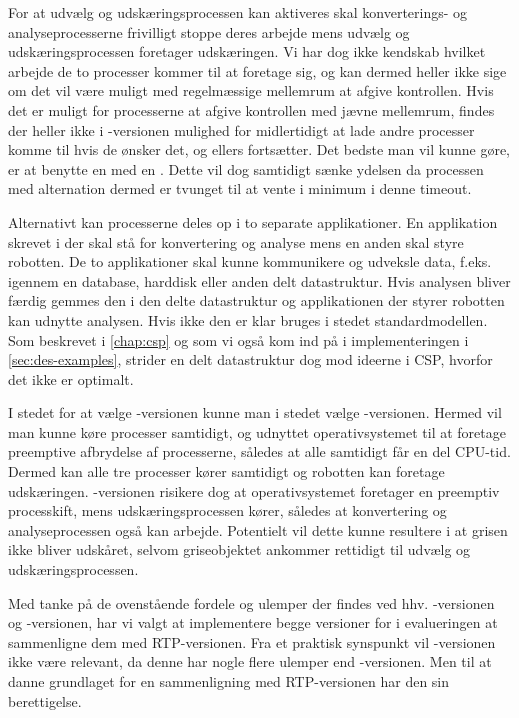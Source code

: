 For at  udvælg og udskæringsprocessen kan aktiveres skal konverterings- og analyseprocesserne frivilligt stoppe deres arbejde mens  udvælg og udskæringsprocessen foretager udskæringen.  Vi har dog ikke kendskab hvilket arbejde de to processer kommer til at foretage sig, og kan dermed heller ikke sige om det vil være muligt med regelmæssige mellemrum at afgive kontrollen. Hvis det er muligt for processerne at afgive kontrollen med jævne mellemrum, findes der heller ikke i -versionen mulighed for midlertidigt at lade andre processer  komme til hvis de ønsker det, og ellers fortsætter. Det bedste man vil kunne gøre, er at benytte en   med en . Dette vil dog samtidigt sænke ydelsen da  processen med alternation dermed er tvunget til at vente i minimum i denne timeout. 

Alternativt kan processerne deles op i to separate applikationer. En applikation skrevet i \pycsp der skal stå for konvertering og analyse mens en anden skal styre robotten. De to applikationer skal kunne kommunikere og  udveksle data, f.eks. igennem en database, harddisk eller anden delt datastruktur. Hvis analysen bliver færdig gemmes den i den delte datastruktur og applikationen der styrer robotten kan udnytte analysen. Hvis ikke den er klar bruges i stedet standardmodellen. Som beskrevet i \autoref{chap:csp} og som vi også kom ind på i implementeringen i \autoref{sec:des-examples}, strider en delt datastruktur dog mod ideerne i CSP, hvorfor det ikke er optimalt.

I stedet for at vælge -versionen kunne man i stedet vælge -versionen. Hermed vil man kunne køre processer samtidigt, og udnyttet operativsystemet til at foretage preemptive afbrydelse af  processerne, således at alle samtidigt får en del CPU-tid. Dermed kan alle tre processer kører samtidigt og robotten kan foretage udskæringen. -versionen risikere dog at operativsystemet foretager en preemptiv processkift, mens udskæringsprocessen kører, således at konvertering og  analyseprocessen også kan arbejde. Potentielt vil dette kunne resultere i at grisen ikke bliver udskåret, selvom griseobjektet ankommer rettidigt til udvælg og udskæringsprocessen.

Med tanke på de ovenstående fordele og ulemper der findes ved hhv.  -versionen og -versionen,  har vi valgt at implementere begge versioner for i evalueringen at sammenligne dem med RTP-versionen. Fra et praktisk synspunkt vil -versionen ikke være relevant, da denne har nogle flere ulemper end -versionen. Men til at danne grundlaget for en sammenligning med RTP-versionen har den sin berettigelse.

